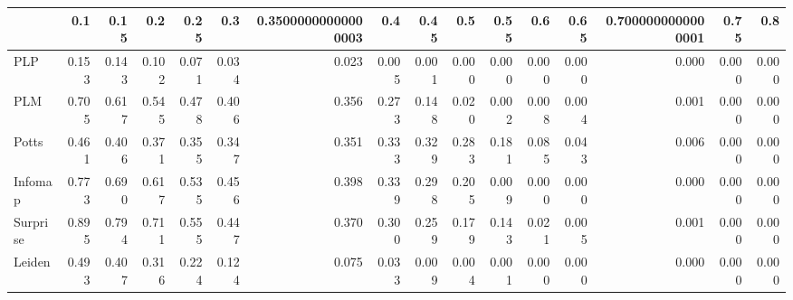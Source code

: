 \begin{tabular}{lrrrrrrrrrrrrrrr}
\toprule
{} &   0.1 &  0.15 &   0.2 &  0.25 &   0.3 & 0.35000000000000003 &   0.4 &  0.45 &   0.5 &  0.55 &   0.6 &  0.65 & 0.7000000000000001 &  0.75 &   0.8 \\
\midrule
PLP      & 0.153 & 0.143 & 0.102 & 0.071 & 0.034 &               0.023 & 0.005 & 0.001 & 0.000 & 0.000 & 0.000 & 0.000 &              0.000 & 0.000 & 0.000 \\
PLM      & 0.705 & 0.617 & 0.545 & 0.478 & 0.406 &               0.356 & 0.273 & 0.148 & 0.020 & 0.002 & 0.008 & 0.004 &              0.001 & 0.000 & 0.000 \\
Potts    & 0.461 & 0.406 & 0.371 & 0.355 & 0.347 &               0.351 & 0.333 & 0.329 & 0.283 & 0.181 & 0.085 & 0.043 &              0.006 & 0.000 & 0.000 \\
Infomap  & 0.773 & 0.690 & 0.617 & 0.535 & 0.456 &               0.398 & 0.339 & 0.298 & 0.205 & 0.009 & 0.000 & 0.000 &              0.000 & 0.000 & 0.000 \\
Surprise & 0.895 & 0.794 & 0.711 & 0.555 & 0.447 &               0.370 & 0.300 & 0.259 & 0.179 & 0.143 & 0.021 & 0.005 &              0.001 & 0.000 & 0.000 \\
Leiden   & 0.493 & 0.407 & 0.316 & 0.224 & 0.124 &               0.075 & 0.033 & 0.009 & 0.004 & 0.001 & 0.000 & 0.000 &              0.000 & 0.000 & 0.000 \\
\bottomrule
\end{tabular}
